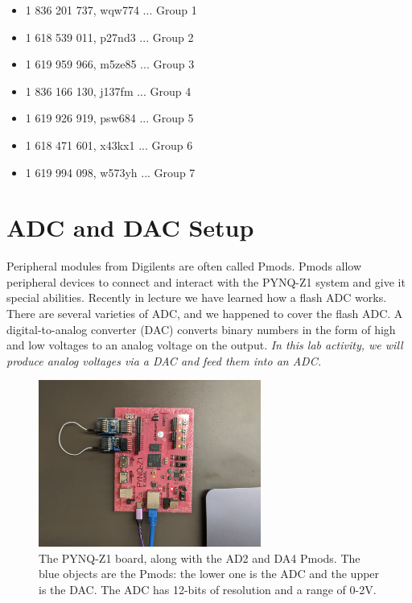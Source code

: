 \documentclass{article}
\begin{document}
\begin{itemize}
\item 1 836 201 737, wqw774 ... Group 1
\item 1 618 539 011, p27nd3 ... Group 2
\item 1 619 959 966, m5ze85 ... Group 3
\item 1 836 166 130, j137fm ... Group 4
\item 1 619 926 919, psw684 ... Group 5
\item 1 618 471 601, x43kx1 ... Group 6
\item 1 619 994 098, w573yh ... Group 7
\end{itemize}

\section{ADC and DAC Setup}

Peripheral modules from Digilents are often called Pmods.  Pmods allow peripheral devices to connect and interact with the PYNQ-Z1 system and give it special abilities.  Recently in lecture we have learned how a flash ADC works.  There are several varieties of ADC, and we happened to cover the flash ADC.  A digital-to-analog converter (DAC) converts binary numbers in the form of high and low voltages to an analog voltage on the output.  \textit{In this lab activity, we will produce analog voltages via a DAC and feed them into an ADC.}

\begin{figure}[ht]
\centering
\includegraphics[width=0.65\textwidth]{IMG_20200408_121757.jpg}
\caption{\label{fig:setup1} The PYNQ-Z1 board, along with the AD2 and DA4 Pmods.  The blue objects are the Pmods: the lower one is the ADC and the upper is the DAC.  The ADC has 12-bits of resolution and a range of 0-2V.}
\end{figure}
\end{document}
